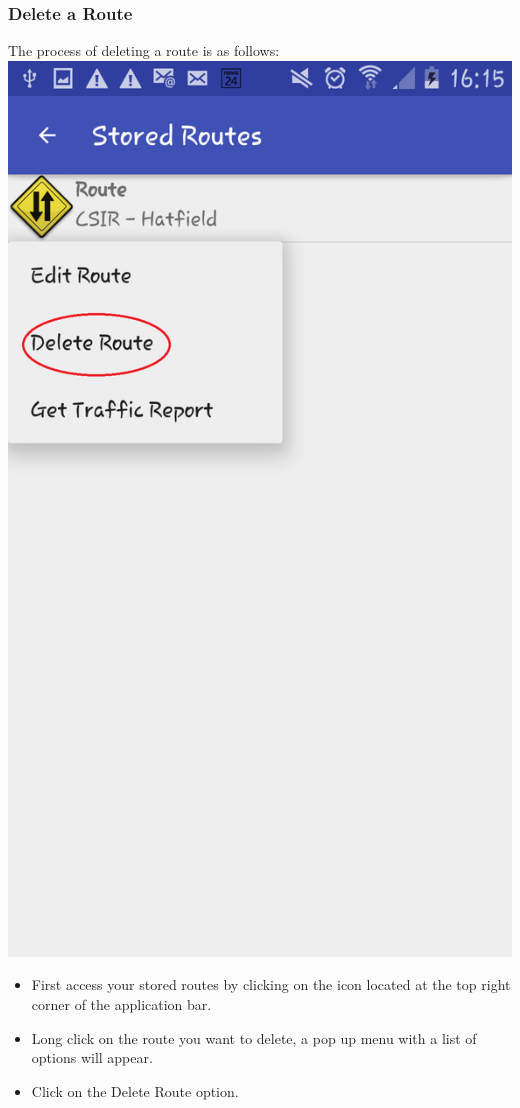 \documentclass[a4paper,12pt]{article}
\begin{document}
\subsubsection{Delete a Route}
The process of deleting a route is as follows:
\includegraphics[width=\textwidth]{images/DeleteOption.png}
\begin{itemize}
    \item First access your stored routes by  clicking on the icon located at the top right corner of the application bar. 
    \item Long click on the route you want to delete, a pop up menu with a list of options will appear.
    \item Click on the Delete Route option.
\end{itemize}
\end{document}
